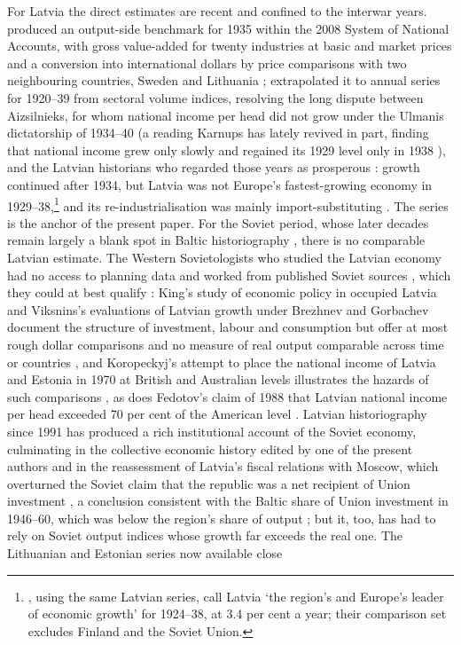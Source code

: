 For Latvia the direct estimates are recent and confined to the interwar years. \textcite{norkuslatvia1935} produced an output-side benchmark for 1935 within the 2008 System of National Accounts, with gross value-added for twenty industries at basic and market prices and a conversion into international dollars by price comparisons with two neighbouring countries, Sweden and Lithuania \parencite{Klimantas2024}; \textcite{Klimantas2024} extrapolated it to annual series for 1920--39 from sectoral volume indices, resolving the long dispute between Aizsilnieks, for whom national income per head did not grow under the Ulmanis dictatorship of 1934--40 (a reading Karnups has lately revived in part, finding that national income grew only slowly and regained its 1929 level only in 1938 \parencite[145, 148--9]{karnups_2017_karla}), and the Latvian historians who regarded those years as prosperous \parencite[26]{krumins_2017_laika_lidz}: growth continued after 1934, but Latvia was not Europe's fastest-growing economy in 1929--38,\footnote{\textcite[3, 19--20]{bukowski_2026_economic}, using the same Latvian series, call Latvia `the region's and Europe's leader of economic growth' for 1924--38, at 3.4 per cent a year; their comparison set excludes Finland and the Soviet Union.} and its re-industrialisation was mainly import-substituting \parencites[790, 834]{latvija19141945vesture}[188]{valge_1994_tartu}. The series is the anchor of the present paper. For the Soviet period, whose later decades remain largely a blank spot in Baltic historiography \parencite[98]{koll_2025_reinterpretation}, there is no comparable Latvian estimate. The Western Sovietologists who studied the Latvian economy had no access to planning data and worked from published Soviet sources \parencite[485]{grybkauskas_2022_economic}, which they could at best qualify \parencite[e.g.][289]{years_of_dependence}: King's study of economic policy in occupied Latvia and Viksnins's evaluations of Latvian growth under Brezhnev and Gorbachev document the structure of investment, labour and consumption but offer at most rough dollar comparisons \parencite[238--9]{viksnins_1986_latvian} and no measure of real output comparable across time or countries \parencite{king_1965_economic,viksnins_1981_evaluating}, and Koropeckyj's attempt to place the national income of Latvia and Estonia in 1970 at British and Australian levels illustrates the hazards of such comparisons \parencite[68, 72]{bs_livingstandards1976}, as does Fedotov's claim of 1988 that Latvian national income per head exceeded 70 per cent of the American level \parencite[166]{kukk2005}. Latvian historiography since 1991 has produced a rich institutional account of the Soviet economy, culminating in the collective economic history edited by one of the present authors and in the reassessment of Latvia's fiscal relations with Moscow, which overturned the Soviet claim that the republic was a net recipient of Union investment \parencites{gatis_lv_eh}{gatis_compensations}, a conclusion consistent with the Baltic share of Union investment in 1946--60, which was below the region's share of output \parencite[233]{vaskela_2014_lietuvos}; but it, too, has had to rely on Soviet output indices whose growth far exceeds the real one. The Lithuanian and Estonian series now available close 